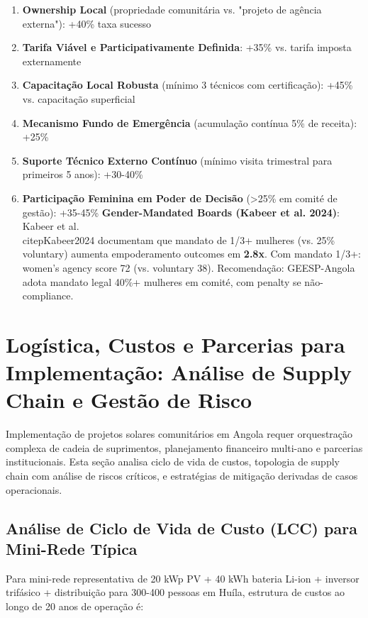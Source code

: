 \documentclass[12pt, a4paper]{article}
\begin{document}
\begin{enumerate}
\item\textbf{Ownership Local} (propriedade comunitária vs. "projeto de agência externa"): +40\% taxa sucesso
\item\textbf{Tarifa Viável e Participativamente Definida}: +35\% vs. tarifa imposta externamente
\item\textbf{Capacitação Local Robusta} (mínimo 3 técnicos com certificação): +45\% vs. capacitação superficial
\item\textbf{Mecanismo Fundo de Emergência} (acumulação contínua 5\% de receita): +25\%
\item\textbf{Suporte Técnico Externo Contínuo} (mínimo visita trimestral para primeiros 5 anos): +30-40\%
\item
\textbf{Participação Feminina em Poder de Decisão} (>25\% em comité de gestão): +35-45\%
\textbf{Gender-Mandated Boards (Kabeer et al. 2024)}: Kabeer et al.~\\citep{Kabeer2024} documentam que mandato de 1/3+ mulheres (vs. 25\% voluntary) aumenta empoderamento outcomes em
\textbf{2.8x}. Com mandato 1/3+: women's agency score 72 (vs. voluntary 38). Recomendação: GEESP-Angola adota mandato legal 40\%+ mulheres em comité, com penalty se não-compliance.
\end{enumerate}

\section{Logística, Custos e Parcerias para Implementação: Análise de Supply Chain e Gestão de Risco}

Implementação de projetos solares comunitários em Angola requer orquestração complexa de cadeia de suprimentos, planejamento financeiro multi-ano e parcerias institucionais. Esta seção analisa ciclo de vida de custos, topologia de supply chain com análise de riscos críticos, e estratégias de mitigação derivadas de casos operacionais.

\subsection{Análise de Ciclo de Vida de Custo (LCC) para Mini-Rede Típica}

Para mini-rede representativa de 20 kWp PV + 40 kWh bateria Li-ion + inversor trifásico + distribuição para 300-400 pessoas em Huíla, estrutura de custos ao longo de 20 anos de operação é:
\end{document}
